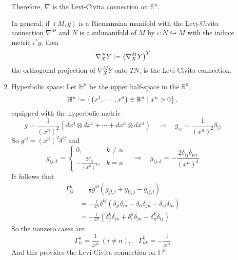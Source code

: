 \begin{enumerate}[label=\arabic{*}.]
\begin{exam}
\begin{enumerate}[label=(\arabic{*})]
\begin{equation*}
			\end{equation*}
			Therefore, $\nabla$ is the Levi-Civita connection on $\mathbb{S}^n$.
			\begin{rmk}
				In general, if $(M,g)$ is a Riemannian manifold with the Levi-Civita connection $\nabla^M$ and $N$ is a submanifold of $M$ by $\iota \colon N \hookrightarrow M$ with the induce metric $\iota^*g$, then
				\begin{equation*}
					\nabla^N_XY \vcentcolon= \left(\nabla^M_XY\right)^T
				\end{equation*}
				the orthogonal projection of $\nabla^M_XY$ onto $TN$, is the Levi-Civita connection.
			\end{rmk}
			\item Hyperbolic space: Let $\mathbb{H}^n$ be the upper half-space in the $\mathbb{R}^n$,
			\begin{equation*}
				\mathbb{H}^n\vcentcolon=\left\{\left(x^1, \cdots, x^n\right) \in \mathbb{R}^n \mid x^n>0\right\},
			\end{equation*}
			equipped with the hyperbolic metric
			\begin{equation*}
				g=\frac{1}{\left(x^n\right)^2}\left(d x^1 \otimes d x^1+\cdots+d x^n \otimes d x^n\right) \quad \Rightarrow \quad g_{ij} = \frac{1}{\left(x^n\right)^2} \delta_{ij}
			\end{equation*}
			So $g^{ij} = \left(x^n\right)^2 \delta^{ij}$ and
			\begin{equation*}
				g_{ij,k} = \left\{
					\begin{array}{ll}
						0, &k \neq n\\
						-\frac{2\delta_{ij}}{\left(x^n\right)^3},& k=n
					\end{array}
				\right.\quad \Rightarrow \quad g_{ij,k} = -\frac{2\delta_{ij}\delta_{kn}}{\left(x^n\right)^3}
			\end{equation*}
			It follows that 
			\begin{equation*}
				\begin{aligned}
					\Gamma_{i j}^k&=\frac{1}{2} g^{k l}\left(g_{j l, i}+g_{l i, j}-g_{i j, l}\right) \\
					&= -\frac{1}{x^n} \delta^{kl}\left(\delta_{jl}\delta_{in}+\delta_{li}\delta_{jn}-\delta_{ij}\delta_{ln}\right) \\
					&= -\frac{1}{x^n} \left(\delta^k_j\delta_{in} + \delta^k_i\delta_{jn} - \delta^k_n\delta_{ij}\right)
				\end{aligned}
			\end{equation*}
			So the nonzero cases are
			\begin{equation*}
				\Gamma^n_{ii} = \frac{1}{x^n}~(i \neq n),\quad \Gamma^k_{nk} = -\frac{1}{x^n}
			\end{equation*}
			And this provides the Levi-Civita connection on $\mathbb{H}^n$.
		\end{enumerate}
	\end{exam}


\end{enumerate}
